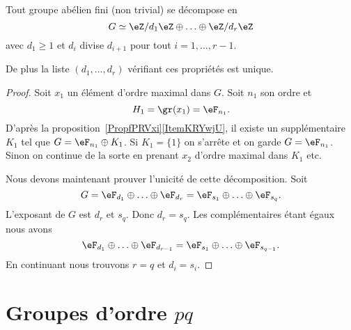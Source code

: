 \begin{theorem} \label{ThoRJWVJd}
    Tout groupe abélien fini (non trivial) se décompose en
    \begin{equation}
        G\simeq \eZ/d_1\eZ\oplus\ldots\oplus \eZ/d_r\eZ
    \end{equation}
    avec \( d_1\geq 1\) et \( d_i\) divise \( d_{i+1}\) pour tout \( i=1,\ldots, r-1\).

    De plus la liste \( (d_1,\ldots, d_r)\) vérifiant ces propriétés est unique.
\end{theorem}

\begin{proof}
    Soit \( x_1\) un élément d'ordre maximal dans \( G\). Soit \( n_1\) son ordre et
    \begin{equation}
        H_1=\gr(x_1)=\eF_{n_1}.
    \end{equation}
    D'après la proposition~\ref{PropfPRVxi}\ref{ItemKRYwjU}, il existe un supplémentaire \( K_1\) tel que \( G=\eF_{n_1}\oplus K_1\). Si \( K_1=\{ 1 \}\) on s'arrête et on garde \( G=\eF_{n_1}\). Sinon on continue de la sorte en prenant \( x_2\) d'ordre maximal dans \( K_1\) etc.

    Nous devons maintenant prouver l'unicité de cette décomposition. Soit
    \begin{equation}
        G=\eF_{d_1}\oplus\ldots\oplus \eF_{d_r}=\eF_{s_1}\oplus\ldots\oplus \eF_{s_q}.
    \end{equation}
    L'exposant de \( G\) est \( d_r\) et \( s_q\). Donc \( d_r=s_q\). Les complémentaires étant égaux nous avons
    \begin{equation}
        \eF_{d_1}\oplus\ldots\oplus \eF_{d_{r-1}}=\eF_{s_1}\oplus\ldots\oplus \eF_{s_{q-1}}.
    \end{equation}
    En continuant nous trouvons \( r=q\) et \( d_i=s_i\).
\end{proof}

\section{Groupes d'ordre \texorpdfstring{$ pq$}{pq}}

